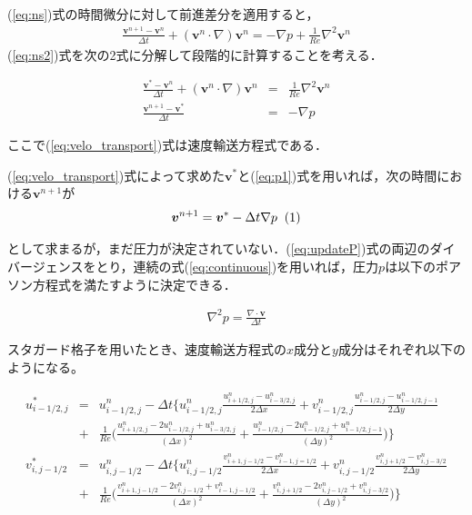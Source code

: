 \documentclass[twocolumn,oneside,a4paper]{article}
\newcommand\inlineeqno{\stepcounter{equation}\ (\theequation)}
\begin{document}
(\ref{eq:ns})式の時間微分に対して前進差分を適用すると，
\begin{eqnarray}\label{eq:ns2}
     \frac{\bm{v}^{n+1}-\bm{v}^n}{\Delta t} + (\bm{v}^n \cdot \nabla )\bm{v}^n = - \nabla p + \frac{1}{Re} \nabla^2 \bm{v}^n
\end{eqnarray}
(\ref{eq:ns2})式を次の2式に分解して段階的に計算することを考える．

\begin{eqnarray}
     \frac{\bm{v}^{\ast}-\bm{v}^n}{\Delta t} + (\bm{v}^n \cdot \nabla )\bm{v}^n &=& \frac{1}{Re} \nabla^2 \bm{v}^n \label{eq:velo_transport}\\
     \frac{\bm{v}^{n+1}-\bm{v}^{\ast}}{\Delta t} &=& - \nabla p     \label{eq:p1}
\end{eqnarray}

ここで(\ref{eq:velo_transport})式は速度輸送方程式である．

(\ref{eq:velo_transport})式によって求めた$\bm{v}^\ast$と(\ref{eq:p1})式を用いれば，次の時間における$\bm{v}^{n+1}$が
\begin{eqnarray}
\bm{v}^{n+1}=\bm{v}^{\ast}-\Delta t \nabla p \: \inlineeqno \label{eq:updateP}    
\end{eqnarray}

として求まるが，まだ圧力が決定されていない．(\ref{eq:updateP})式の両辺のダイバージェンスをとり，連続の式(\ref{eq:continuous})を用いれば，圧力$p$は以下のポアソン方程式を満たすように決定できる．

\begin{eqnarray}
     \nabla^2 p = \frac{\nabla \cdot \bm{v}}{\Delta t}
\end{eqnarray}



スタガード格子を用いたとき、速度輸送方程式の$x$成分と$y$成分はそれぞれ以下のようになる。
\begin{strip}
\begin{eqnarray}         
     u^\ast_{i-1/2,j} &=& u^n_{i-1/2,j} - \Delta t \Bigg \{u^n_{i-1/2,j}\frac{u^n_{i+1/2,j}-u^n_{i-3/2,j}}{2\Delta x}+ v^n_{i-1/2,j}\frac{u^n_{i-1/2,j}-u^n_{i-1/2,j-1}}{2\Delta y} \nonumber \\
     &+& \frac{1}{Re}\Bigg( \frac{u^n_{i+1/2,j}-2u^n_{i-1/2,j}+u^n_{i-3/2,j}}{(\Delta x)^2}+\frac{u^n_{i-1/2,j}-2u^n_{i-1/2,j}+u^n_{i-1/2,j-1}}{(\Delta y)^2} \Bigg) \Bigg\} \\
     v^\ast_{i,j-1/2} &=& u^n_{i,j-1/2} - \Delta t \Bigg \{u^n_{i,j-1/2}\frac{v^n_{i+1,j-1/2}-v^n_{i-1,j=1/2}}{2\Delta x}+ v^n_{i,j-1/2}\frac{v^n_{i,j+1/2}-v^n_{i,j-3/2}}{2\Delta y} \nonumber \\
     &+& \frac{1}{Re}\Bigg( \frac{v^n_{i+1,j-1/2}-2v^n_{i,j-1/2}+v^n_{i-1,j-1/2}}{(\Delta x)^2}+\frac{v^n_{i,j+1/2}-2v^n_{i,j-1/2}+v^n_{i,j-3/2}}{(\Delta y)^2} \Bigg) \Bigg\}
\end{eqnarray}
\end{strip}
\end{document}
